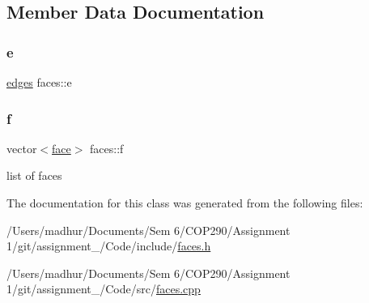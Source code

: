 \subsection{Member Data Documentation}
\mbox{\label{classfaces_a7b0632e23cbcdf8cbcabdcaad85fda7b}} 
\subsubsection{\texorpdfstring{e}{e}}
{\footnotesize\ttfamily \mbox{\hyperlink{classedges}{edges}} faces\+::e\hspace{0.3cm}{\ttfamily [private]}}

\mbox{\label{classfaces_a66837134b8414721f7461840769bcc65}} 
\subsubsection{\texorpdfstring{f}{f}}
{\footnotesize\ttfamily vector$<$\mbox{\hyperlink{structface}{face}}$>$ faces\+::f\hspace{0.3cm}{\ttfamily [private]}}



list of faces 



The documentation for this class was generated from the following files\+:\begin{DoxyCompactItemize}
\item 
/\+Users/madhur/\+Documents/\+Sem 6/\+C\+O\+P290/\+Assignment 1/git/assignment\+\_/\+Code/include/\mbox{\hyperlink{faces_8h}{faces.\+h}}\item 
/\+Users/madhur/\+Documents/\+Sem 6/\+C\+O\+P290/\+Assignment 1/git/assignment\+\_/\+Code/src/\mbox{\hyperlink{faces_8cpp}{faces.\+cpp}}\end{DoxyCompactItemize}
